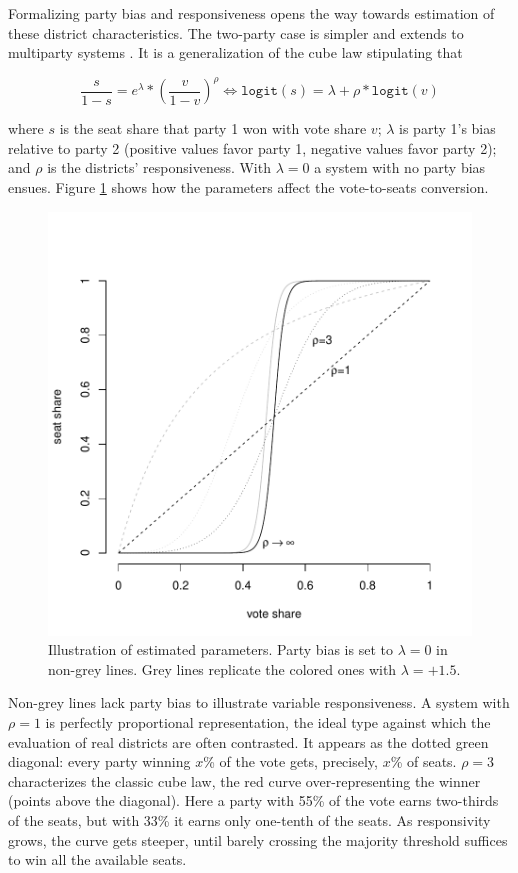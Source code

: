 \documentclass[letter,12pt]{article}
\begin{document}
Formalizing party bias and responsiveness opens the way towards estimation of these district characteristics. The two-party case is simpler and extends to multiparty systems \citep{taagepera.CubeLaw.1973,tufte1973seatsVotes,king.browning1987biasRespUS}. It is a generalization of the cube law stipulating that 

\begin{equation}
 \frac{s}{1-s} = e^\lambda *  \left(\frac{v}{1-v}\right)^\rho \iff
 \texttt{logit}(s) = \lambda + \rho *  \texttt{logit}(v)
\end{equation}\label{E:cubeLaw}

\noindent where $s$ is the seat share that party 1 won with vote share $v$; $\lambda$ is party 1's bias relative to party 2 (positive values favor party 1, negative values favor party 2); and $\rho$ is the districts' responsiveness. With $\lambda=0$ a system with no party bias ensues. Figure \ref{F:lambdaRhoEx} shows how the parameters affect the vote-to-seats conversion. 

\begin{figure}
\begin{center}
    \includegraphics[width=.55\columnwidth]{../graphs/rhoExample.pdf} 
\caption{Illustration of estimated parameters. Party bias is set to $\lambda=0$ in non-grey lines. Grey lines replicate the colored ones with $\lambda=+1.5$.}\label{F:lambdaRhoEx}
\end{center}
\end{figure}

Non-grey lines lack party bias to illustrate variable responsiveness. A system with $\rho=1$ is perfectly proportional representation, the ideal type against which the evaluation of real districts are often contrasted. It appears as the dotted green diagonal: every party winning $x$\% of the vote gets, precisely, $x$\% of seats. $\rho=3$ characterizes the classic cube law, the red curve over-representing the winner (points above the diagonal). Here a party with 55\% of the vote earns two-thirds of the seats, but with 33\% it earns only one-tenth of the seats. As responsivity grows, the curve gets steeper, until barely crossing the majority threshold suffices to win all the available seats. 
\end{document}
